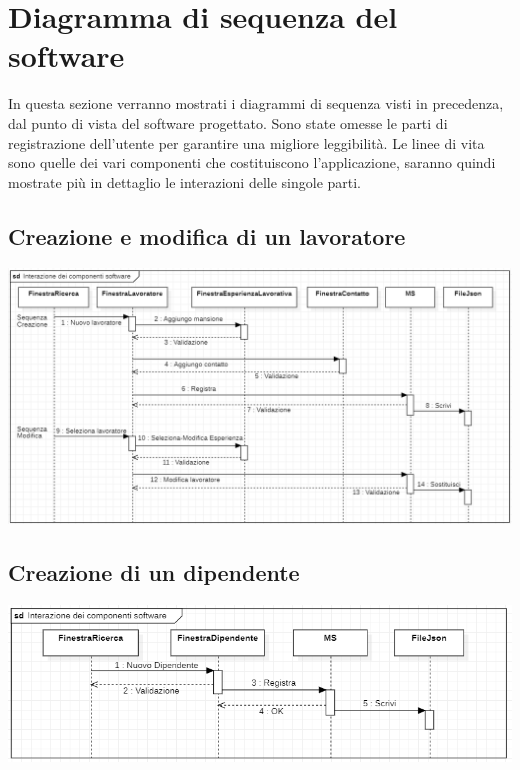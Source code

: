 \documentclass[ 4paper,11pt,openany]{book}
\begin{document}
\section{Diagramma di sequenza del software}
In questa sezione verranno mostrati i diagrammi di sequenza visti in precedenza, dal punto di vista del software progettato. Sono state omesse le parti di registrazione dell'utente per garantire una migliore leggibilità. Le linee di vita sono quelle dei vari componenti che costituiscono l'applicazione, saranno quindi mostrate più in dettaglio le interazioni delle singole parti.
\subsection{Creazione e modifica di un lavoratore}
\includegraphics[width=180mm]{softwareseq.png}
\subsection{Creazione di un dipendente}
\includegraphics[width=180mm]{softwareseq2.png}
\end{document}
